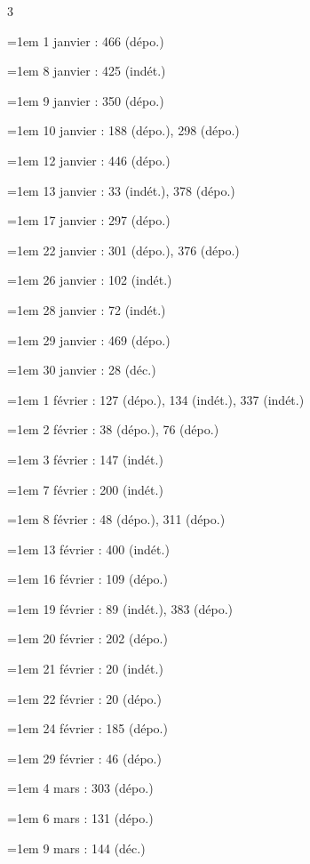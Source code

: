\begin{multicols}{3}\footnotesize\setlength{\parindent}{0pt}\raggedright
\hangindent=1em 1 janvier : 466 (dépo.)\par
\hangindent=1em 8 janvier : 425 (indét.)\par
\hangindent=1em 9 janvier : 350 (dépo.)\par
\hangindent=1em 10 janvier : 188 (dépo.), 298 (dépo.)\par
\hangindent=1em 12 janvier : 446 (dépo.)\par
\hangindent=1em 13 janvier : 33 (indét.), 378 (dépo.)\par
\hangindent=1em 17 janvier : 297 (dépo.)\par
\hangindent=1em 22 janvier : 301 (dépo.), 376 (dépo.)\par
\hangindent=1em 26 janvier : 102 (indét.)\par
\hangindent=1em 28 janvier : 72 (indét.)\par
\hangindent=1em 29 janvier : 469 (dépo.)\par
\hangindent=1em 30 janvier : 28 (déc.)\par
\hangindent=1em 1 février : 127 (dépo.), 134 (indét.), 337 (indét.)\par
\hangindent=1em 2 février : 38 (dépo.), 76 (dépo.)\par
\hangindent=1em 3 février : 147 (indét.)\par
\hangindent=1em 7 février : 200 (indét.)\par
\hangindent=1em 8 février : 48 (dépo.), 311 (dépo.)\par
\hangindent=1em 13 février : 400 (indét.)\par
\hangindent=1em 16 février : 109 (dépo.)\par
\hangindent=1em 19 février : 89 (indét.), 383 (dépo.)\par
\hangindent=1em 20 février : 202 (dépo.)\par
\hangindent=1em 21 février : 20 (indét.)\par
\hangindent=1em 22 février : 20 (dépo.)\par
\hangindent=1em 24 février : 185 (dépo.)\par
\hangindent=1em 29 février : 46 (dépo.)\par
\hangindent=1em 4 mars : 303 (dépo.)\par
\hangindent=1em 6 mars : 131 (dépo.)\par
\hangindent=1em 9 mars : 144 (déc.)\par

\end{multicols}
